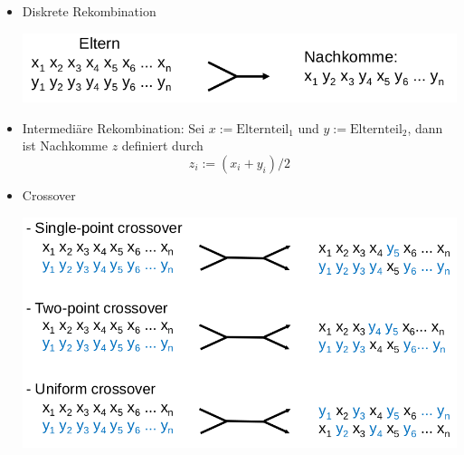 \begin{itemize}
	\item Diskrete Rekombination
	\begin{center}
	\includegraphics[width=.6\textwidth]{figures/diskrete_rekombination.png}
	\end{center}
	\item Intermediäre Rekombination: Sei $x := \text{Elternteil}_1$ und $y := \text{Elternteil}_2$, dann ist Nachkomme $z$ definiert durch
	\begin{equation*}
		z_i := (x_i + y_i) / 2
	\end{equation*}
	\item Crossover
	\begin{center}
	\includegraphics[width=.5\textwidth]{figures/crossover.png}	
	\end{center}
\end{itemize}


